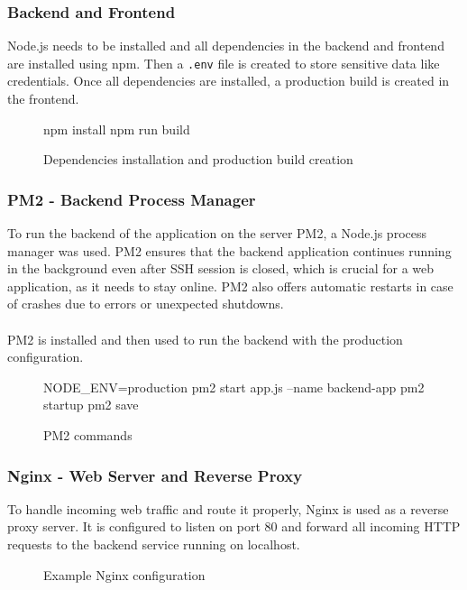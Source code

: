 \documentclass[a4paper,12pt]{report}
\begin{document}
\subsubsection{Backend and Frontend}
Node.js needs to be installed and all dependencies in the backend and frontend are installed using npm. Then a \texttt{.env} file is created to store sensitive data like credentials. Once all dependencies are installed, a production build is created in the frontend.
\begin{figure}[H]
	\begin{terminal}
		npm install
		npm run build
	\end{terminal}
	\caption{Dependencies installation and production build creation}
\end{figure}
\subsubsection{PM2 - Backend Process Manager}
To run the backend of the application on the server PM2, a Node.js process manager was used. PM2 ensures that the backend application continues running in the background even after SSH session is closed, which is crucial for a web application, as it needs to stay online. PM2 also offers automatic restarts in case of crashes due to errors or unexpected shutdowns.\\\\
PM2 is installed and then used to run the backend with the production configuration.
\begin{figure}[H]
	\begin{terminal}
		NODE_ENV=production pm2 start app.js --name backend-app
		pm2 startup
		pm2 save
	\end{terminal}
	\caption{PM2 commands}
\end{figure}
\subsubsection{Nginx - Web Server and Reverse Proxy}
To handle incoming web traffic and route it properly, Nginx is used as a reverse proxy server. It is configured to listen on port 80 and forward all incoming HTTP requests to the backend service running on localhost.
\begin{figure}[H]
	\caption{Example Nginx configuration}
\end{figure}
\end{document}
